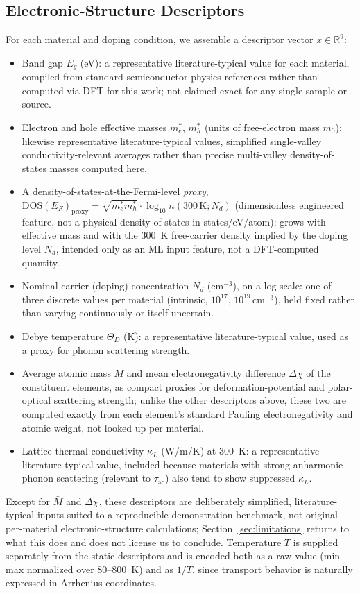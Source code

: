 \documentclass[11pt]{article}
\begin{document}
\subsection{Electronic-Structure Descriptors}

For each material and doping condition, we assemble a descriptor vector $x \in \mathbb{R}^{9}$:
\begin{itemize}
\item Band gap $E_g$ (eV): a representative literature-typical value for each material, compiled from standard semiconductor-physics references rather than computed via DFT for this work; not claimed exact for any single sample or source.
\item Electron and hole effective masses $m_e^{*}$, $m_h^{*}$ (units of free-electron mass $m_0$): likewise representative literature-typical values, simplified single-valley conductivity-relevant averages rather than precise multi-valley density-of-states masses computed here.
\item A density-of-states-at-the-Fermi-level \emph{proxy}, $\text{DOS}(E_F)_{\text{proxy}} = \sqrt{m_e^{*} m_h^{*}} \cdot \log_{10} n(300\,\text{K}; N_d)$ (dimensionless engineered feature, not a physical density of states in states/eV/atom): grows with effective mass and with the 300~K free-carrier density implied by the doping level $N_d$, intended only as an ML input feature, not a DFT-computed quantity.
\item Nominal carrier (doping) concentration $N_d$ ($\text{cm}^{-3}$), on a log scale: one of three discrete values per material (intrinsic, $10^{17}$, $10^{19}\,\text{cm}^{-3}$), held fixed rather than varying continuously or itself uncertain.
\item Debye temperature $\Theta_D$ (K): a representative literature-typical value, used as a proxy for phonon scattering strength.
\item Average atomic mass $\bar{M}$ and mean electronegativity difference $\Delta\chi$ of the constituent elements, as compact proxies for deformation-potential and polar-optical scattering strength; unlike the other descriptors above, these two are computed exactly from each element's standard Pauling electronegativity and atomic weight, not looked up per material.
\item Lattice thermal conductivity $\kappa_L$ (W/m/K) at 300~K: a representative literature-typical value, included because materials with strong anharmonic phonon scattering (relevant to $\tau_{\text{ac}}$) also tend to show suppressed $\kappa_L$.
\end{itemize}
Except for $\bar{M}$ and $\Delta\chi$, these descriptors are deliberately simplified, literature-typical inputs suited to a reproducible demonstration benchmark, not original per-material electronic-structure calculations; Section~\ref{sec:limitations} returns to what this does and does not license us to conclude.
Temperature $T$ is supplied separately from the static descriptors and is encoded both as a raw value (min--max normalized over 80--800~K) and as $1/T$, since transport behavior is naturally expressed in Arrhenius coordinates.
\end{document}
